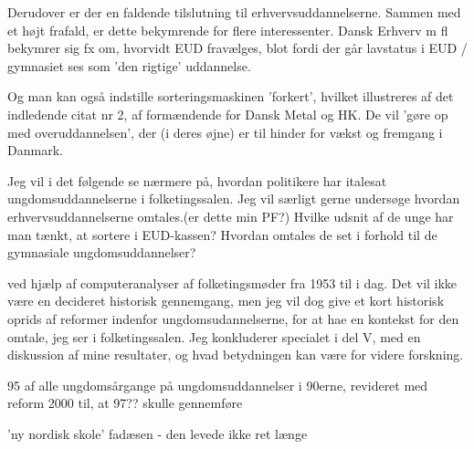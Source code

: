 Derudover er der en faldende tilslutning til erhvervsuddannelserne. Sammen med et højt frafald, er dette bekymrende for flere interessenter.
Dansk Erhverv m fl bekymrer sig fx om, hvorvidt EUD fravælges, blot fordi der går lavstatus i EUD / gymnasiet ses som 'den rigtige' uddannelse.

Og man kan også indstille sorteringsmaskinen 'forkert', hvilket illustreres af det indledende citat nr 2, af formændende for Dansk Metal og HK.
De vil 'gøre op med overuddannelsen', der (i deres øjne) er til hinder for vækst og fremgang i Danmark. 

Jeg vil i det følgende se nærmere på, hvordan politikere har italesat ungdomsuddannelserne i folketingssalen.
Jeg vil særligt gerne undersøge hvordan  erhvervsuddannelserne omtales.\todo(er dette min PF?)
Hvilke udsnit af de unge har man tænkt, at sortere i EUD-kassen?
Hvordan omtales de set i forhold til de gymnasiale ungdomsuddannelser? 

ved hjælp af computeranalyser af folketingsmøder fra 1953 til i dag.
Det vil ikke være en decideret historisk gennemgang, men jeg vil dog give et kort historisk oprids af reformer indenfor ungdomsudannelserne, for at hae en kontekst for den omtale, jeg ser i folketingssalen.
Jeg konkluderer specialet i del V, med en diskussion af mine resultater, og hvad betydningen kan være for videre forskning.

95 \perc af alle ungdomsårgange på ungdomsuddannelser i 90erne, revideret med reform 2000 til, at 97?? skulle gennemføre

'ny nordisk skole' fadæsen - den levede ikke ret længe
